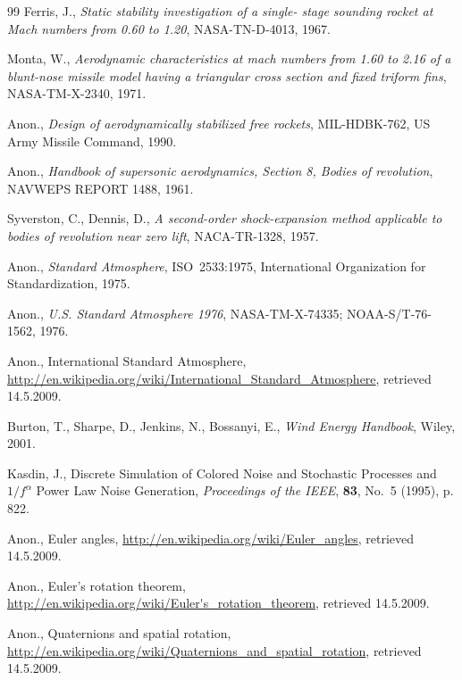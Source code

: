 \documentclass[a4paper,12pt,oneside]{book}
\begin{document}
\begin{thebibliography}{99}
 Ferris, J., {\it Static stability
  investigation of a single- stage sounding rocket at Mach numbers
  from 0.60 to 1.20}, NASA-TN-D-4013, 1967.

 Monta, W., {\it Aerodynamic
  characteristics at mach numbers from 1.60 to 2.16 of a blunt-nose
  missile model having a triangular cross section and fixed triform
  fins}, NASA-TM-X-2340, 1971.

 Anon., {\it Design of aerodynamically stabilized
  free rockets}, MIL-HDBK-762, US Army Missile Command, 1990.

 Anon., {\it Handbook of
  supersonic aerodynamics, Section 8, Bodies of revolution}, 
  NAVWEPS REPORT 1488, 1961.

 Syverston, C., Dennis,
  D., {\it A second-order shock-expansion method applicable to bodies
  of revolution near zero lift}, NACA-TR-1328, 1957.

 Anon., {\it Standard
  Atmosphere}, ISO~2533:1975, International Organization for
  Standardization, 1975.

 Anon., {\it U.S. Standard Atmosphere
  1976}, NASA-TM-X-74335; NOAA-S/T-76-1562, 1976.

  Anon., International Standard Atmosphere,
  \url{http://en.wikipedia.org/wiki/International_Standard_Atmosphere},
  retrieved 14.5.2009.

 Burton, T., Sharpe, D., Jenkins, N.,
  Bossanyi, E., {\it Wind Energy Handbook}, Wiley, 2001.

  Kasdin, J., Discrete Simulation of Colored
  Noise and Stochastic Processes and $1/f^\alpha$ Power Law Noise
  Generation, {\it Proceedings of the IEEE}, {\bf 83}, No.~5 (1995),
  p. 822.

 Anon., Euler angles,
  \url{http://en.wikipedia.org/wiki/Euler_angles}, retrieved 14.5.2009.

 Anon., Euler's rotation theorem,
  \url{http://en.wikipedia.org/wiki/Euler's_rotation_theorem},
  retrieved 14.5.2009.

 Anon., Quaternions and spatial
  rotation,
  \url{http://en.wikipedia.org/wiki/Quaternions_and_spatial_rotation},
  retrieved 14.5.2009.


\end{thebibliography}
\end{document}
